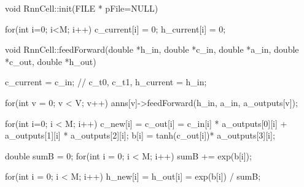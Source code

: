 void RnnCell::init(FILE * pFile=NULL){

  for(int i=0; i<M; i++){
    c\_current[i] = 0;
    h\_current[i] = 0;
  }
}

void RnnCell::feedForward(double *h\_in, double *c\_in, double *a\_in, double *c\_out, double *h\_out){

  c\_current = c\_in; // c\_t0, c\_t1,
  h\_current = h\_in;

  for(int v = 0; v < V; v++)
    anns[v]->feedForward(h\_in, a\_in, a\_outputs[v]);

  for(int i=0; i < M; i++){
    c\_new[i] = c\_out[i] = c\_in[i] * a\_outputs[0][i] + a\_outputs[1][i] * a\_outputs[2][i];
    b[i] = tanh(c\_out[i])* a\_outputs[3][i];
  }

  double sumB = 0;
  for(int i = 0; i < M; i++)
    sumB += exp(b[i]);

  for(int i = 0; i < M; i++)
    h\_new[i] = h\_out[i] = exp(b[i]) / sumB;

}


